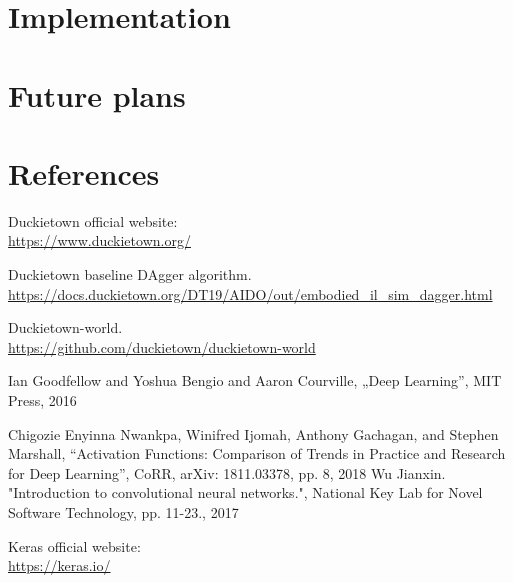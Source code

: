 \documentclass{article}
\begin{document}

\section*{Implementation}

\vspace*{2\baselineskip}


\section*{Future plans}
\pagebreak


\section*{References}
\vspace*{1\baselineskip}

Duckietown official website:
\\
\url{https://www.duckietown.org/}
\vspace*{1\baselineskip}

Duckietown baseline DAgger algorithm.
\\
\url{https://docs.duckietown.org/DT19/AIDO/out/embodied_il_sim_dagger.html} 
\vspace*{1\baselineskip}

Duckietown-world.
\\
\url{https://github.com/duckietown/duckietown-world}

\vspace*{1\baselineskip}

Ian Goodfellow and Yoshua Bengio and Aaron Courville, „Deep Learning”, MIT Press, 2016

\vspace*{1\baselineskip}
Chigozie Enyinna Nwankpa, Winifred Ijomah, Anthony Gachagan, and Stephen Marshall, “Activation Functions: Comparison of Trends in Practice and Research for Deep Learning”, CoRR, arXiv: 1811.03378, pp. 8, 2018
\vspace*{1\baselineskip}
Wu Jianxin. "Introduction to convolutional neural networks.", National Key Lab for Novel Software Technology, pp. 11-23., 2017
\vspace*{1\baselineskip}
\vspace*{1\baselineskip}

Keras official website: 
\\
\url{https://keras.io/}
\vspace*{1\baselineskip}
\end{document}
